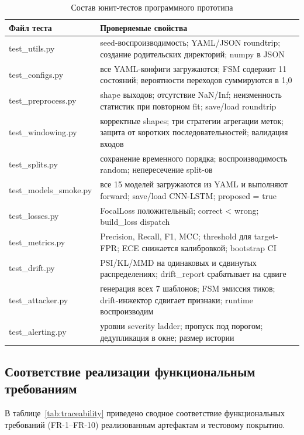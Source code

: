 \begin{table}[H]
\caption{Состав юнит-тестов программного прототипа}
\label{tab:tests}
\centering
\small
\begin{tabularx}{\linewidth}{|L{3.6cm}|Z|}
\hline
Файл теста & Проверяемые свойства \\
\hline
test\_utils.py        & seed-воспроизводимость; YAML/JSON roundtrip;
создание родительских директорий; numpy в JSON \\
\hline
test\_configs.py      & все YAML-конфиги загружаются; FSM содержит
11 состояний; вероятности переходов суммируются в 1{,}0 \\
\hline
test\_preprocess.py   & shape выходов; отсутствие NaN/Inf;
неизменность статистик при повторном fit; save/load roundtrip \\
\hline
test\_windowing.py    & корректные shapes; три стратегии агрегации
меток; защита от коротких последовательностей; валидация входов \\
\hline
test\_splits.py       & сохранение временного порядка;
воспроизводимость random; непересечение split-ов \\
\hline
test\_models\_smoke.py& все 15 моделей загружаются из YAML и
выполняют forward; save/load CNN-LSTM; proposed = true \\
\hline
test\_losses.py       & FocalLoss положительный; correct < wrong;
build\_loss dispatch \\
\hline
test\_metrics.py      & Precision, Recall, F1, MCC; threshold для
target-FPR; ECE снижается калибровкой; bootstrap CI \\
\hline
test\_drift.py        & PSI/KL/MMD на одинаковых и сдвинутых
распределениях; drift\_report срабатывает на сдвиге \\
\hline
test\_attacker.py     & генерация всех 7 шаблонов; FSM эмиссия
тиков; drift-инжектор сдвигает признаки; runtime воспроизводим \\
\hline
test\_alerting.py     & уровни severity ladder; пропуск под
порогом; дедупликация в окне; размер истории \\
\hline
\end{tabularx}
\end{table}

\subsection{Соответствие реализации функциональным требованиям}

В таблице~\ref{tab:traceability} приведено сводное соответствие
функциональных требований (FR-1--FR-10) реализованным артефактам и
тестовому покрытию.

